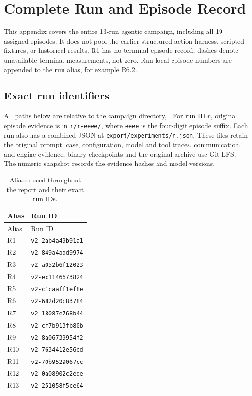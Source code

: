 \section{Complete Run and Episode Record}
\label{app:complete}
This appendix covers the entire 13-run agentic campaign, including all 19
assigned episodes. It does not pool the earlier structured-action harness,
scripted fixtures, or historical results. R1 has no terminal episode record;
dashes denote unavailable terminal measurements, not zero. Run-local episode
numbers are appended to the run alias, for example R6.2.

\subsection{Exact run identifiers}
All paths below are relative to the campaign directory,
.
For run ID $r$, original episode evidence is in \texttt{r/r-eeee/}, where
\texttt{eeee} is the four-digit episode suffix. Each run also has a
combined JSON at \texttt{export/experiments/r.json}. These files retain the
original prompt, case, configuration, model and tool traces, communication,
and engine evidence; binary checkpoints and the original archive use Git LFS.
The numeric snapshot records the evidence hashes and model versions.

\begin{longtable}{ll}
\caption{Aliases used throughout the report and their exact run IDs.}
\label{tab:run-ids}\\
\toprule Alias & Run ID\\\midrule
\endfirsthead
\toprule Alias & Run ID\\\midrule
\endhead
R1 & \texttt{v2-2ab4a49b91a1}\\
R2 & \texttt{v2-849a4aad9974}\\
R3 & \texttt{v2-a052b6f12023}\\
R4 & \texttt{v2-ec1146673824}\\
R5 & \texttt{v2-c1caaff1ef8e}\\
R6 & \texttt{v2-682d20c83784}\\
R7 & \texttt{v2-18087e768b44}\\
R8 & \texttt{v2-cf7b913fb80b}\\
R9 & \texttt{v2-8a06739954f2}\\
R10 & \texttt{v2-7634412e56ed}\\
R11 & \texttt{v2-70b9529067cc}\\
R12 & \texttt{v2-0a08902c2ede}\\
R13 & \texttt{v2-251058f5ce64}\\
\bottomrule
\end{longtable}

